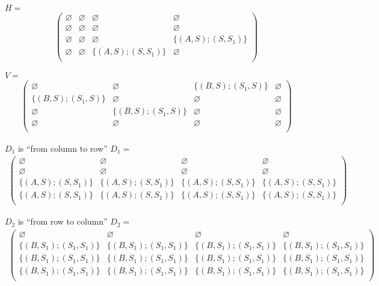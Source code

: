 \documentclass[12pt]{article}  %
\theoremstyle{definition}
\theoremstyle{remark}
\begin{document}
$H=$
\begin{align*}
\begin{pmatrix}
\varnothing       & \varnothing & \varnothing & \varnothing       \\
\varnothing       & \varnothing & \varnothing & \varnothing \\
\varnothing       & \varnothing & \varnothing & \{(A,S);(S,S_1)\}    \\
\varnothing       & \varnothing & \{(A,S);(S,S_1)\} & \varnothing  \\
\end{pmatrix}
\end{align*}



$V=$
\begin{align*}
\begin{pmatrix}
\varnothing       & \varnothing & \{(B,S);(S_1,S)\} & \varnothing       \\
\{(B,S);(S_1,S)\} & \varnothing & \varnothing & \varnothing \\
\varnothing       & \{(B,S);(S_1,S)\} & \varnothing & \varnothing  \\
\varnothing       & \varnothing & \varnothing & \varnothing  \\
\end{pmatrix}
\end{align*}

$D_1$ is ``from column to row''
$D_1 = $
\begin{align*}
\begin{pmatrix}
\varnothing       & \varnothing & \varnothing & \varnothing       \\
\varnothing       & \varnothing & \varnothing & \varnothing       \\
\{(A,S);(S,S_1)\}       & \{(A,S);(S,S_1)\} & \{(A,S);(S,S_1)\} & \{(A,S);(S,S_1)\} \\
\{(A,S);(S,S_1)\}       & \{(A,S);(S,S_1)\} & \{(A,S);(S,S_1)\} & \{(A,S);(S,S_1)\} \\
\end{pmatrix}
\end{align*}

$D_2$ is ``from row to column''
$D_2 = $
\begin{align*}
\begin{pmatrix}
\varnothing       & \varnothing & \varnothing & \varnothing       \\
\{(B,S_1);(S_1,S_1)\}       & \{(B,S_1);(S_1,S_1)\} & \{(B,S_1);(S_1,S_1)\} & \{(B,S_1);(S_1,S_1)\}       \\
\{(B,S_1);(S_1,S_1)\}       & \{(B,S_1);(S_1,S_1)\} & \{(B,S_1);(S_1,S_1)\} & \{(B,S_1);(S_1,S_1)\}       \\
\{(B,S_1);(S_1,S_1)\}       & \{(B,S_1);(S_1,S_1)\} & \{(B,S_1);(S_1,S_1)\} & \{(B,S_1);(S_1,S_1)\}       \\
\end{pmatrix}
\end{align*}
\end{document}
